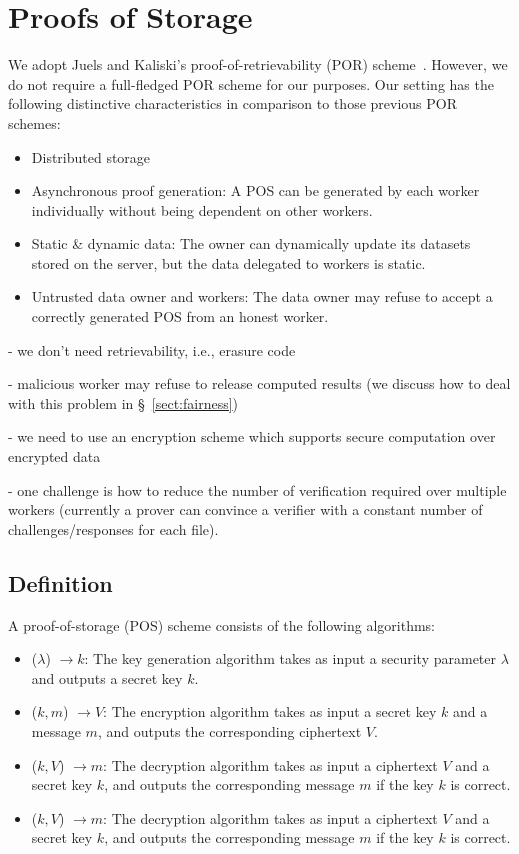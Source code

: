 \section{Proofs of Storage} \label{sect:pos}

We adopt Juels and Kaliski's proof-of-retrievability (POR) scheme~\cite{JK07}.
However, we do not require a full-fledged POR scheme for our purposes.
Our setting has the following distinctive characteristics in comparison to those previous POR schemes:
\begin{itemize}
 \item Distributed storage
 \item Asynchronous proof generation: A POS can be generated by each worker individually without being dependent on other workers.
 \item Static \& dynamic data: The owner can dynamically update its datasets stored on the server, but the data delegated to workers is static.
 \item Untrusted data owner and workers: The data owner may refuse to accept a correctly generated POS from an honest worker.
\end{itemize}

- we don't need retrievability, i.e., erasure code

- malicious worker may refuse to release computed results (we discuss how to deal with this problem in \S~\ref{sect:fairness})

- we need to use an encryption scheme which supports secure computation over encrypted data

- one challenge is how to reduce the number of verification required over multiple workers (currently a prover can convince a verifier with a constant number of challenges/responses for each file).

\subsection{Definition} \label{sect:pos-definition}

A proof-of-storage (POS) scheme consists of the following algorithms:
\begin{itemize}
\item \Setup($\lambda$) $\rightarrow k$: The key generation algorithm takes as input a security parameter $\lambda$ and outputs a secret key $k$.

\item \Challenge($k, m$) $\rightarrow V$: The encryption algorithm takes as input a secret key $k$ and a message $m$, and outputs the corresponding ciphertext $V$.

\item \Response($k, V$) $\rightarrow m$: The decryption algorithm takes as input a ciphertext $V$ and a secret key $k$, and outputs the corresponding message $m$ if the key $k$ is correct.

\item \Verify($k, V$) $\rightarrow m$: The decryption algorithm takes as input a ciphertext $V$ and a secret key $k$, and outputs the corresponding message $m$ if the key $k$ is correct.
\end{itemize}



